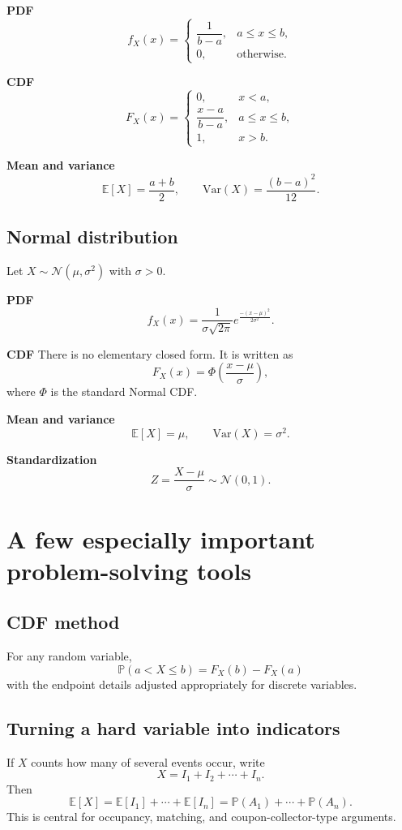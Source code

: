 \documentclass[11pt]{article}
\newcommand{\E}{\mathbb{E}}
\newcommand{\Var}{\mathrm{Var}}
\newcommand{\Prob}{\mathbb{P}}
\newcommand{\1}{\mathbf{1}}
\newcommand{\Normal}{\mathcal{N}}
\begin{document}
\textbf{PDF}
\[
    f_X(x)=
    \begin{cases}
        \dfrac{1}{b-a}, & a\le x\le b,\\
        0, & \text{otherwise}.
    \end{cases}
\]

\textbf{CDF}
\[
    F_X(x)=
    \begin{cases}
        0, & x<a,\\
        \dfrac{x-a}{b-a}, & a\le x\le b,\\
        1, & x>b.
    \end{cases}
\]

\textbf{Mean and variance}
\[
    \E[X]=\frac{a+b}{2}, \qquad \Var(X)=\frac{(b-a)^2}{12}.
\]

\subsection{Normal distribution}
Let $X\sim \Normal(\mu,\sigma^2)$ with $\sigma>0$.

\textbf{PDF}
\[
    f_X(x)=\frac{1}{\sigma\sqrt{2\pi}}e^\frac{-(x-\mu)^2}{2\sigma^2}.
\]

\textbf{CDF}
There is no elementary closed form. It is written as
\[
    F_X(x)=\Phi\!\left(\frac{x-\mu}{\sigma}\right),
\]
where $\Phi$ is the standard Normal CDF.

\textbf{Mean and variance}
\[
    \E[X]=\mu, \qquad \Var(X)=\sigma^2.
\]

\textbf{Standardization}
\[
    Z=\frac{X-\mu}{\sigma} \sim \Normal(0,1).
\]

\section{A few especially important problem-solving tools}

\subsection{CDF method}
For any random variable,
\[
    \Prob(a<X\le b)=F_X(b)-F_X(a)
\]
with the endpoint details adjusted appropriately for discrete variables.

\subsection{Turning a hard variable into indicators}
If $X$ counts how many of several events occur, write
\[
    X=I_1+I_2+\cdots+I_n.
\]
Then
\[
    \E[X]=\E[I_1]+\cdots+\E[I_n]=\Prob(A_1)+\cdots+\Prob(A_n).
\]
This is central for occupancy, matching, and coupon-collector-type arguments.
\end{document}
